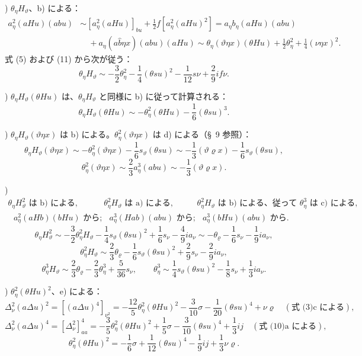 \documentclass[11pt]{jlreq}
\newcommand{\A}{\Delta}
\newcommand{\R}{\varrho}
\begin{document}
) $\theta_\eta H_\vartheta$、b) による：
\[
\begin{aligned}
a_\eta^2(aHu)(abu)&\sim [a_\eta^2(aHu)]_{bu}+\frac12 f[a_\eta^2(aHu)^2]
=a_\eta b_\eta(aHu)(abu)\\
&\quad+a_\eta(a\widehat{b}\eta x)(abu)(aHu)
\sim \theta_\eta(\vartheta\eta x)(\theta Hu)+\frac12\theta_\eta^2+\frac14(\nu\eta x)^2.
\end{aligned}
\]
式 (5) および (11) から次が従う：
\[
\theta_\eta H_\vartheta\sim -\frac32\theta_\eta^2-\frac14(\theta su)^2-\frac1{12}s\nu+\frac29if\nu.
\]

) $\theta_\eta H_\vartheta(\theta Hu)$ は、$\theta_\eta H_\vartheta$ と同様に b) に従って計算される：
\[
\theta_\eta H_\vartheta(\theta Hu)\sim-\theta_\eta^2(\theta Hu)-\frac16(\theta su)^3.
\]

) $\theta_\eta H_\vartheta(\vartheta\eta x)$ は b) による。$\theta_\eta^2(\vartheta\eta x)$ は d) による（\S\ 9 参照）：
\[
\theta_\eta H_\vartheta(\vartheta\eta x)\sim-\theta_\eta^2(\vartheta\eta x)-\frac16s_\vartheta(\theta su)
\sim-\frac13(\vartheta\R x)-\frac16s_\vartheta(\theta su),
\]
\[
\theta_\eta^2(\vartheta\eta x)\sim\frac23a_\eta^3(abu)\sim-\frac13(\vartheta\R x).
\]

)
\[
\begin{array}{ccc}
\theta_\eta H_\vartheta^2\text{ は b) による},&
\theta_\eta^2H_\vartheta\text{ は a) による},&
\theta_\eta^2H_\vartheta\text{ は b) による、従って }\theta_\eta^3\text{ は c) による},\\
\text{ }a_\eta^2(aHb)(bHu)\text{ から};&
\text{ }a_\eta^3(Hab)(abu)\text{ から};&
\text{ }a_\eta^3(bHu)(abu)\text{ から}.
\end{array}
\]
\[
\theta_\eta H_\vartheta^2\sim-\frac32\theta_\eta^2H_\vartheta-\frac14s_\vartheta(\theta su)^2+\frac16s_\nu-\frac49ia_\nu
\sim-\theta_\R-\frac16s_\nu-\frac19ia_\nu,
\]
\[
\theta_\eta^2H_\vartheta\sim\frac23\theta_\R-\frac16s_\vartheta(\theta su)^2+\frac29s_\nu-\frac29ia_\nu,
\]
\[
\theta_\eta^3H_\vartheta\sim\frac23\theta_\R-\frac23\theta_\eta^3+\frac5{36}s_\nu,
\qquad
\theta_\eta^3\sim\frac14s_\vartheta(\theta su)^2-\frac18s_\nu+\frac13ia_\nu.
\]

) $\theta_\eta^2(\theta Hu)^2$、e) による：
\[
\A_\nu^2(a\A u)^2=[(a\A u)^4]_{\nu^2}
=-\frac{12}{5}\theta_\eta^2(\theta Hu)^2-\frac3{10}\sigma-\frac1{20}(\theta su)^4+\nu\R
\quad(\text{式 (3)c による}),
\]
\[
\A_\nu^2(a\A u)^4=[\A_\nu^2]_{aa}^4=-\frac35\theta_\eta^2(\theta Hu)^2+\frac15\sigma-\frac3{10}(\theta su)^4+\frac13ij
\quad(\text{式 (10)a による}),
\]
\[
\theta_\eta^2(\theta Hu)^2=-\frac16\sigma+\frac1{12}(\theta su)^4-\frac19ij+\frac13\nu\R.
\]
\end{document}
